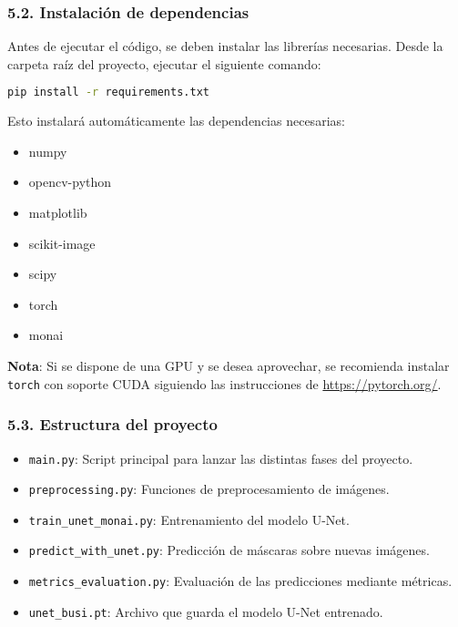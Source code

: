 \documentclass[12pt]{article}
\begin{document}
\subsubsection*{5.2. Instalación de dependencias}

Antes de ejecutar el código, se deben instalar las librerías necesarias.  
Desde la carpeta raíz del proyecto, ejecutar el siguiente comando:

\begin{lstlisting}[language=bash]
pip install -r requirements.txt
\end{lstlisting}

Esto instalará automáticamente las dependencias necesarias:
\begin{itemize}
    \item numpy
    \item opencv-python
    \item matplotlib
    \item scikit-image
    \item scipy
    \item torch
    \item monai
\end{itemize}

\textbf{Nota}: Si se dispone de una GPU y se desea aprovechar, se recomienda instalar \texttt{torch} con soporte CUDA siguiendo las instrucciones de \url{https://pytorch.org/}.

\subsubsection*{5.3. Estructura del proyecto}

\begin{itemize}
    \item \texttt{main.py}: Script principal para lanzar las distintas fases del proyecto.
    \item \texttt{preprocessing.py}: Funciones de preprocesamiento de imágenes.
    \item \texttt{train\_unet\_monai.py}: Entrenamiento del modelo U-Net.
    \item \texttt{predict\_with\_unet.py}: Predicción de máscaras sobre nuevas imágenes.
    \item \texttt{metrics\_evaluation.py}: Evaluación de las predicciones mediante métricas.
    \item \texttt{unet\_busi.pt}: Archivo que guarda el modelo U-Net entrenado.
\end{itemize}
\end{document}
